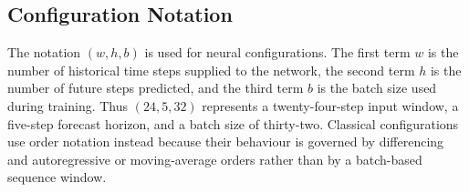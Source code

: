 \documentclass[11pt,a4paper]{article}
\begin{document}
\begin{appendices}
\begin{table}[h!]
\centering
\caption{Interpretation guide for the reported evaluation metrics.}\label{tab:metric-guide}
\small
{}
\end{table}

\section{Configuration Notation}\label{app:configuration-notation}

The notation $(w,h,b)$ is used for neural configurations. The first term $w$ is the number of historical time steps supplied to the network, the second term $h$ is the number of future steps predicted, and the third term $b$ is the batch size used during training. Thus $(24,5,32)$ represents a twenty-four-step input window, a five-step forecast horizon, and a batch size of thirty-two. Classical configurations use order notation instead because their behaviour is governed by differencing and autoregressive or moving-average orders rather than by a batch-based sequence window.

\end{appendices}
\end{document}
